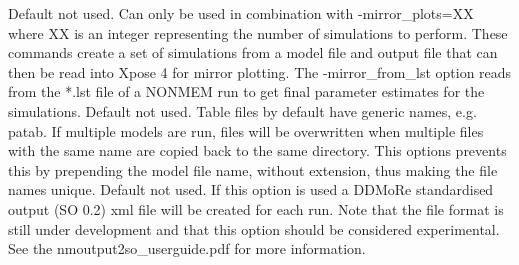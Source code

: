 \begin{optionlist}
\nextopt
{}
Default not used. Can only be used in combination with -mirror\_plots=XX where XX is an integer representing the number of simulations to perform.  These commands create a set of simulations from a model file and output file that can then be read into Xpose 4 for mirror plotting.  The -mirror\_from\_lst option reads from the *.lst file of a NONMEM run to get final parameter estimates for the simulations. 
\nextopt
{}
Default not used. Table files by default have generic names, e.g. patab. If multiple models are run, files will be overwritten when multiple files with the same name are copied back to the same directory. This options prevents this by prepending the model file name, without extension, thus making the file names unique. 
\nextopt
{}
Default not used. If this option is used a DDMoRe standardised output (SO 0.2) xml file will be created for each run. Note that the file format is still under development and that this option should be considered experimental. See the \mbox{nmoutput2so\_userguide.pdf} for more information.
\nextopt
\end{optionlist}
